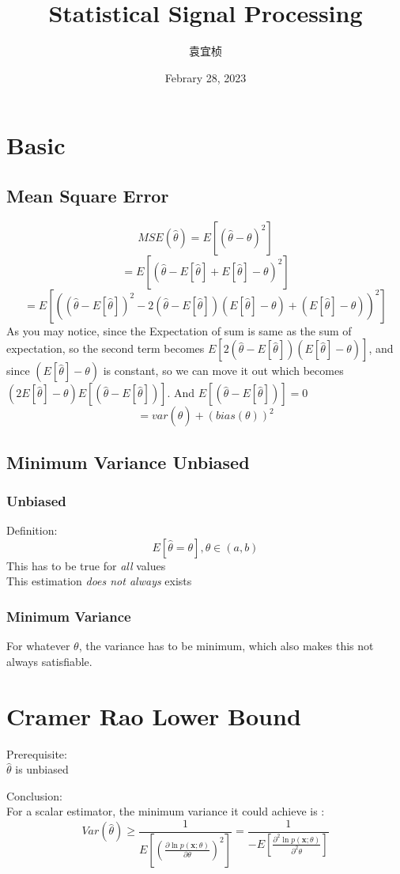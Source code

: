 \documentclass{article}
\title{Statistical Signal Processing}
\author{袁宜桢}
\date{Febrary 28, 2023}
\begin{document}
\maketitle
\section{Basic}
\subsection{Mean Square Error}
$$ MSE(\hat{\theta})=E[(\hat{\theta}-\theta)^2] $$
$$ =E[(\hat{\theta}-E[\hat{\theta}]+E[\hat{\theta}]-\theta)^2] $$
$$ =E[((\hat{\theta}-E[\hat{\theta}])^2-2(\hat{\theta}-E[\hat{\theta}])(E[\hat{\theta
}]-\theta)+(E[\hat{\theta}]-\theta))^2] $$
As you may notice, since the Expectation of sum is same as the sum of expectation, so the second term becomes
$E[2(\hat{\theta}-E[\hat{\theta}])(E[\hat{\theta}]-\theta)]$, and since $(E[\hat{\theta}]-\theta)$ is constant, so we can move it out which becomes$(2E[\hat{\theta}]-\theta)E[(\hat{\theta}-E[\hat{\theta}])]$. And $E[(\hat{\theta}-E[\hat{\theta}])]=0$
$$ =var(\hat{\theta})+(bias(\theta))^2 $$
\subsection{Minimum Variance Unbiased}
\subsubsection{Unbiased}
Definition:
$$ E[\hat{\theta}=\theta],\theta\in (a,b) $$
This has to be true for \textit{all} values\\
This estimation \textit{does not always} exists
\subsubsection{Minimum Variance}
For whatever $\theta$, the variance has to be minimum, which also makes this not always satisfiable.\\
\section{Cramer Rao Lower Bound}
Prerequisite:\\
$\hat{\theta}$ is unbiased

Conclusion:\\
For a scalar estimator, the minimum variance it could achieve is :$$ Var(\hat{\theta})\geq \frac{1}{E[(\frac{\partial \ln{p(\bm{x};\theta)}}{\partial \theta})^2]}=\frac{1}{-E[\frac{\partial^2 \ln{p(\bm{x};\theta)}}{\partial^2 \theta}]}  $$
\end{document}
